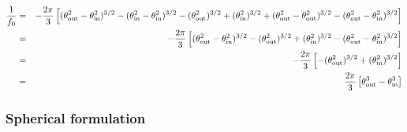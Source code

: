 \documentclass{article}[12pt,a4]
\begin{document}
\begin{eqnarray}
\frac{1}{f_0} & = &
  -\frac{2 \pi}{3} \left[ (\theta_{\rm out}^2 - \theta_{\rm in}^2)^{3/2} -
                               (\theta_{\rm in}^2 - \theta_{\rm in}^2)^{3/2} -
                               (\theta_{\rm out}^2)^{3/2} +
                               (\theta_{\rm in}^2)^{3/2} +
                               (\theta_{\rm out}^2 - \theta_{\rm out}^2)^{3/2} -
                               (\theta_{\rm out}^2 - \theta_{\rm in}^2)^{3/2} \right] \\
& = & -\frac{2 \pi}{3} \left[ (\theta_{\rm out}^2 - \theta_{\rm in}^2)^{3/2} -
                                        (\theta_{\rm out}^2)^{3/2} +
                                        (\theta_{\rm in}^2)^{3/2} -
                                        (\theta_{\rm out}^2 - \theta_{\rm in}^2)^{3/2} \right] \\
& = & -\frac{2 \pi}{3} \left[ -(\theta_{\rm out}^2)^{3/2} + (\theta_{\rm in}^2)^{3/2} \right] \\
& = & \frac{2 \pi}{3} \left[ \theta_{\rm out}^3 - \theta_{\rm in}^3 \right]
\end{eqnarray}


\subsubsection{Spherical formulation}
 
\end{document}
